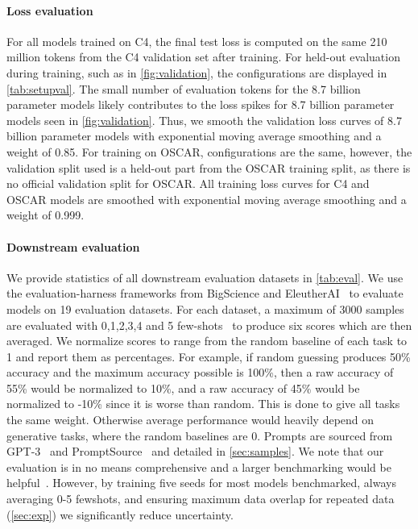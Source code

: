 \documentclass{article}
\begin{document}
\paragraph{Loss evaluation} For all models trained on C4, the final test loss is computed on the same 210 million tokens from the C4 validation set after training. For held-out evaluation during training, such as in \autoref{fig:validation}, the configurations are displayed in \autoref{tab:setupval}. The small number of evaluation tokens for the 8.7 billion parameter models likely contributes to the loss spikes for 8.7 billion parameter models seen in \autoref{fig:validation}. Thus, we smooth the validation loss curves of 8.7 billion parameter models with exponential moving average smoothing and a weight of 0.85. For training on OSCAR, configurations are the same, however, the validation split used is a held-out part from the OSCAR training split, as there is no official validation split for OSCAR. All training loss curves for C4 and OSCAR models are smoothed with exponential moving average smoothing and a weight of 0.999.

\paragraph{Downstream evaluation} We provide statistics of all downstream evaluation datasets in \autoref{tab:eval}. We use the evaluation-harness frameworks from BigScience and EleutherAI~\cite{eval-harness} to evaluate models on 19 evaluation datasets. For each dataset, a maximum of 3000 samples are evaluated with 0,1,2,3,4 and 5 few-shots~\cite{brown2020language} to produce six scores which are then averaged.  We normalize scores to range from the random baseline of each task to 1 and report them as percentages. For example, if random guessing produces 50\% accuracy and the maximum accuracy possible is 100\%, then a raw accuracy
of 55\% would be normalized to 10\%, and a raw accuracy of 45\% would be normalized to -10\% since it is worse than random. This is done to give all tasks the same weight. Otherwise average performance would heavily depend on generative tasks, where the random baselines are 0. Prompts are sourced from GPT-3~\cite{brown2020language} and PromptSource~\cite{promptsource} and detailed in \autoref{sec:samples}. We note that our evaluation is in no means comprehensive and a larger benchmarking would be helpful~\cite{srivastava2022beyond,muennighoff2022mteb}. However, by training five seeds for most models benchmarked, always averaging 0-5 fewshots, and ensuring maximum data overlap for repeated data (\autoref{sec:exp}) we significantly reduce uncertainty.
\end{document}
